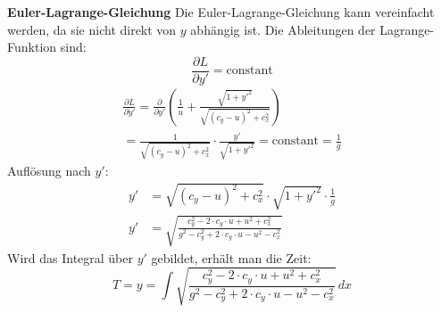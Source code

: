 \textbf{Euler-Lagrange-Gleichung} Die Euler-Lagrange-Gleichung kann vereinfacht werden, da sie nicht direkt von \(y\) abhängig ist. Die Ableitungen der Lagrange-Funktion sind:
\begin{equation}\label{eq:Lagrange_derivites_1}
    \frac{\partial L}{\partial y'} = \text{constant}
\end{equation}
\begin{multline}\label{eq:Lagrange_derivites_2}
    \frac{\partial L}{\partial y'} = \frac{\partial}{\partial y'} \left( \frac{1}{u} + \frac{\sqrt{1 + y'^2}}{\sqrt{(c_y - u)^2 + c_x^2}} \right) \\
    = \frac{1}{\sqrt{(c_y - u)^2 + c_x^2}} \cdot \frac{y'}{\sqrt{1 + y'^2}} = \text{constant} = \frac{1}{g}
\end{multline}
Auflösung nach \(y'\):
\begin{align}
    y' &= \sqrt{(c_y - u)^2 + c_x^2} \cdot \sqrt{1 + y'^2} \cdot \frac{1}{g} \\
    y' &= \sqrt{\frac{c_y^2 - 2 \cdot c_y \cdot u + u^2 + c_x^2}{g^2 - c_y^2 + 2 \cdot c_y \cdot u - u^2 - c_x^2}}\label{eq:angle}
\end{align}
Wird das Integral über \(y'\) gebildet, erhält man die Zeit:
\begin{equation}\label{eq:time_integral}
    T = y = \int \sqrt{\frac{c_y^2 - 2 \cdot c_y \cdot u + u^2 + c_x^2}{g^2 - c_y^2 + 2 \cdot c_y \cdot u - u^2 - c_x^2}} \, dx
\end{equation}





















        



